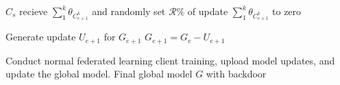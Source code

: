 \documentclass{article}
\begin{document}
\begin{algorithm}[t]
\begin{algorithmic}[1]
		\EndFor
	\State $C_s$ recieve $ \sum_1^k \theta_{C^k_{e+1}}$ and randomly set $ \mathcal{R\%} $ of update $ \sum_1^k \theta_{C^k_{e+1}}$ to zero

	\State Generate update $U_{e+1}$ for $G_{e+1}$
	\State $G_{e+1} = G_e - U_{e+1}$
	\EndFor

	\State Conduct normal federated learning client training, upload model updates, 
	and update the global model.
\EndFor
\State \Return Final global model $G$ with backdoor

	\end{algorithmic}
	

\end{algorithm}
\end{document}
